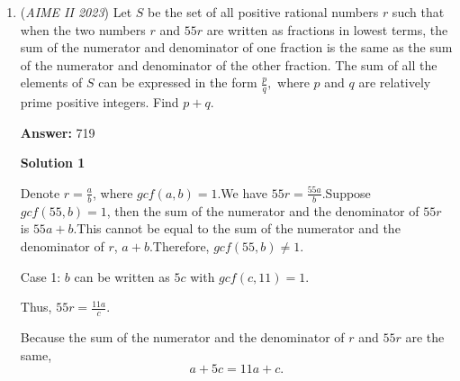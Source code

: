 \begin{enumerate}
 Case 1: $x = \pm 4$

 In this case, we simply plug in $x = 4$ and $x = -4$. We note that $x=4$ is a valid case.

 Case 2: $x \neq \pm 4$

 In this case, using equation (3), we get $y = 15 - \frac{xz}{4}$. Plugging that into equation (1), we get $z = \frac{240-60x}{16-x^2}$. Plugging that expression back into the original expression for $y$ we obtain $y = 15 - \frac{60x-15x^2}{16-x^2}$. Now we plug these two expressions into equation (2):
 \[\left(15 - \frac{60x-15x^2}{16-x^2}\right)\left(\frac{240-60x}{16-x^2}\right) = 60-4x\]multiplying both sides by $(16-x^2)$ and factoring, we get:
 \[\left(15(4-x)(4+x)-60x+15x^2\right)\left(\frac{60(4-x)}{(4+x)(4-x)}\right) = 4(15 - x)(4 + x)(4 - x)\]which simplifies to:
 \[x^3 - 7x^2 - 104x + 660 = 0\]we note that $x = 6$ is a root. Factoring, we get the other roots, -10 and 11. 

 Our desired answer is the sum of the square of all these roots: 
 \[4^2 + 6^2 + (-10)^2 + 11^2 = \boxed{273}\]



	\item (\textit{AIME II 2023}) Let $S$ be the set of all positive rational numbers $r$ such that when the two numbers $r$ and $55r$ are written as fractions in lowest terms, the sum of the numerator and denominator of one fraction is the same as the sum of the numerator and denominator of the other fraction. The sum of all the elements of $S$ can be expressed in the form $\frac{p}{q},$ where $p$ and $q$ are relatively prime positive integers. Find $p+q.$

 \textbf{Answer: }719



\textbf{Solution 1}

Denote $r = \frac{a}{b}$, where $gcf\left( a, b \right) = 1$.We have $55 r = \frac{55a}{b}$.Suppose $gcf\left( 55, b \right) = 1$, then the sum of the numerator and the denominator of $55r$ is $55a + b$.This cannot be equal to the sum of the numerator and the denominator of $r$, $a + b$.Therefore, $gcf\left( 55, b \right) \neq 1$.

 Case 1: $b$ can be written as $5c$ with $gcf\left( c, 11 \right) = 1$.

 Thus, $55r = \frac{11a}{c}$.

 Because the sum of the numerator and the denominator of $r$ and $55r$ are the same,
 \[ a + 5c = 11a + c . \]


\end{enumerate}
